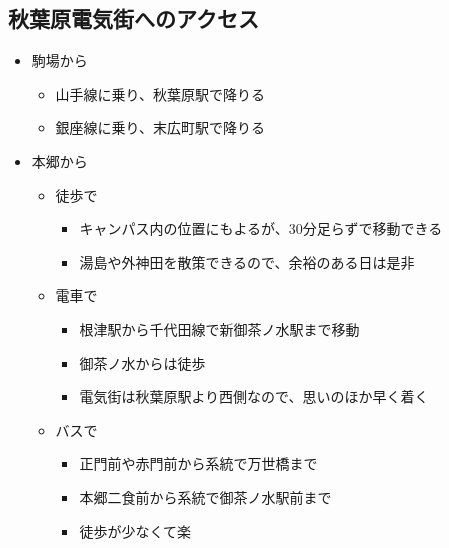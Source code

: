 \documentclass[letterpaper,10pt,dvipdfmx]{sphinxmanual}
\begin{document}
\subsection{秋葉原電気街へのアクセス}
\label{\detokenize{begginers/buy_parts:id5}}\begin{itemize}
\item {} 
駒場から
\begin{itemize}
\item {} 
山手線に乗り、秋葉原駅で降りる

\item {} 
銀座線に乗り、末広町駅で降りる

\end{itemize}

\item {} 
本郷から
\begin{itemize}
\item {} 
徒歩で
\begin{itemize}
\item {} 
キャンパス内の位置にもよるが、30分足らずで移動できる

\item {} 
湯島や外神田を散策できるので、余裕のある日は是非

\end{itemize}

\item {} 
電車で
\begin{itemize}
\item {} 
根津駅から千代田線で新御茶ノ水駅まで移動

\item {} 
御茶ノ水からは徒歩

\item {} 
電気街は秋葉原駅より西側なので、思いのほか早く着く

\end{itemize}

\item {} 
バスで
\begin{itemize}
\item {} 
正門前や赤門前から系統で万世橋まで

\item {} 
本郷二食前から系統で御茶ノ水駅前まで

\item {} 
徒歩が少なくて楽

\end{itemize}

\end{itemize}

\end{itemize}
\end{document}
